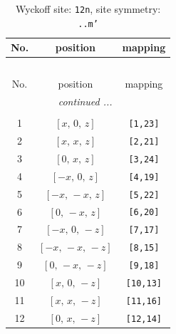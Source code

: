 \documentclass[fleqn,8pt]{jsarticle}
\begin{document}
\begin{longtable}{ccc}
\caption{Wyckoff site: {\tt 12n}, site symmetry: {\tt ..m'}}
 \\
 \hline \hline
No. & position & mapping \\ \hline \endfirsthead

\multicolumn{2}{l}{\tablename\ \thetable{}} \\
 \hline \hline
No. & position & mapping \\ \hline \endhead

 \hline \hline
\multicolumn{2}{r}{\footnotesize\it continued ...} \\ \endfoot

 \hline \hline
\multicolumn{2}{r}{} \\ \endlastfoot

1 & $\left[ x,\, 0,\, z \right]$ & {\tt [1,23]} \\ \hline
2 & $\left[ x,\, x,\, z \right]$ & {\tt [2,21]} \\ \hline
3 & $\left[ 0,\, x,\, z \right]$ & {\tt [3,24]} \\ \hline
4 & $\left[ - x,\, 0,\, z \right]$ & {\tt [4,19]} \\ \hline
5 & $\left[ - x,\, - x,\, z \right]$ & {\tt [5,22]} \\ \hline
6 & $\left[ 0,\, - x,\, z \right]$ & {\tt [6,20]} \\ \hline
7 & $\left[ - x,\, 0,\, - z \right]$ & {\tt [7,17]} \\ \hline
8 & $\left[ - x,\, - x,\, - z \right]$ & {\tt [8,15]} \\ \hline
9 & $\left[ 0,\, - x,\, - z \right]$ & {\tt [9,18]} \\ \hline
10 & $\left[ x,\, 0,\, - z \right]$ & {\tt [10,13]} \\ \hline
11 & $\left[ x,\, x,\, - z \right]$ & {\tt [11,16]} \\ \hline
12 & $\left[ 0,\, x,\, - z \right]$ & {\tt [12,14]} \\
\end{longtable}
\renewcommand{\arraystretch}{1.2}
\end{document}
